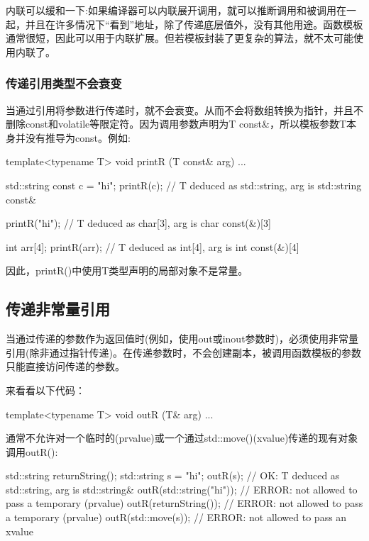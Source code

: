 内联可以缓和一下:如果编译器可以内联展开调用，就可以推断调用和被调用在一起，并且在许多情况下“看到”地址，除了传递底层值外，没有其他用途。函数模板通常很短，因此可以用于内联扩展。但若模板封装了更复杂的算法，就不太可能使用内联了。

\subsubsection{传递引用类型不会衰变}

当通过引用将参数进行传递时，就不会衰变。从而不会将数组转换为指针，并且不删除const和volatile等限定符。因为调用参数声明为T const\&，所以模板参数T本身并没有推导为const。例如:

\begin{cpp}
template<typename T>
void printR (T const& arg) {
	...
}

std::string const c = "hi";
printR(c); // T deduced as std::string, arg is std::string const&

printR("hi"); // T deduced as char[3], arg is char const(&)[3]

int arr[4];
printR(arr); // T deduced as int[4], arg is int const(&)[4]
\end{cpp}

因此，printR()中使用T类型声明的局部对象不是常量。

\subsection{传递非常量引用}

当通过传递的参数作为返回值时(例如，使用out或inout参数时)，必须使用非常量引用(除非通过指针传递)。在传递参数时，不会创建副本，被调用函数模板的参数只能直接访问传递的参数。

来看看以下代码：

\begin{cpp}
template<typename T>
void outR (T& arg) {
	...
}
\end{cpp}

通常不允许对一个临时的(prvalue)或一个通过std::move()(xvalue)传递的现有对象调用outR():

\begin{cpp}
std::string returnString();
std::string s = "hi";
outR(s); // OK: T deduced as std::string, arg is std::string&
outR(std::string("hi")); // ERROR: not allowed to pass a temporary (prvalue)
outR(returnString()); // ERROR: not allowed to pass a temporary (prvalue)
outR(std::move(s)); // ERROR: not allowed to pass an xvalue
\end{cpp}

